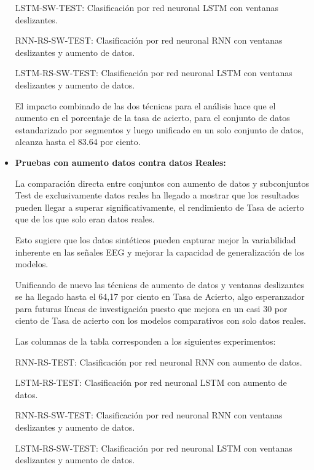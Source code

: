 \begin{itemize}
	LSTM-SW-TEST: Clasificación por red neuronal LSTM con ventanas deslizantes.

	RNN-RS-SW-TEST: Clasificación por red neuronal RNN con ventanas deslizantes y aumento de datos.

	LSTM-RS-SW-TEST: Clasificación por red neuronal LSTM con ventanas deslizantes y aumento de datos.

	
	El impacto combinado de las dos técnicas para el análisis hace que el aumento en el porcentaje de la tasa de acierto, para el conjunto de datos estandarizado por segmentos y luego unificado en un solo conjunto de datos, alcanza hasta el 83.64 por ciento.
	
	
	\item
	\textbf{Pruebas con aumento datos contra datos Reales:}


	La comparación directa entre conjuntos con aumento de datos y subconjuntos Test de exclusivamente datos reales ha llegado a mostrar que los resultados  pueden llegar a superar significativamente, el rendimiento de Tasa de acierto que de los que solo eran datos reales. 
	
	Esto sugiere que los datos sintéticos pueden capturar mejor la variabilidad inherente en las señales EEG y mejorar la capacidad de generalización de los modelos.
	
	Unificando de nuevo las técnicas de aumento de datos y ventanas deslizantes se ha llegado hasta el 64,17 por ciento en Tasa de Acierto, algo esperanzador para futuras líneas de investigación puesto que mejora en un casi 30 por ciento de Tasa de acierto con los modelos comparativos con solo datos reales.


	Las columnas de la tabla corresponden a los siguientes experimentos:

RNN-RS-TEST: Clasificación por red neuronal RNN con aumento de datos.

LSTM-RS-TEST: Clasificación por red neuronal LSTM con aumento de datos.

RNN-RS-SW-TEST: Clasificación por red neuronal RNN con ventanas deslizantes y aumento de datos.

LSTM-RS-SW-TEST: Clasificación por red neuronal LSTM con ventanas deslizantes y aumento de datos.


\end{itemize}





